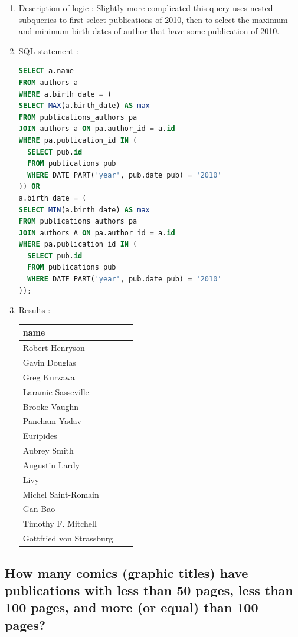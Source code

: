 \documentclass[doubleside, titlepage]{article}
\begin{document}
			\begin{enumerate}
	\item Description of logic : Slightly more complicated this query uses nested subqueries to first select publications of 2010, then to select the maximum and minimum  birth dates of author that have some publication of 2010.
	\item SQL statement :
		\begin{lstlisting}[language=SQL,showspaces=false,basicstyle=\ttfamily,numberstyle=\tiny,commentstyle=\color{gray}]
SELECT a.name
FROM authors a
WHERE a.birth_date = (
SELECT MAX(a.birth_date) AS max
FROM publications_authors pa
JOIN authors a ON pa.author_id = a.id
WHERE pa.publication_id IN (
  SELECT pub.id
  FROM publications pub
  WHERE DATE_PART('year', pub.date_pub) = '2010'
)) OR
a.birth_date = (
SELECT MIN(a.birth_date) AS max
FROM publications_authors pa
JOIN authors A ON pa.author_id = a.id
WHERE pa.publication_id IN (
  SELECT pub.id
  FROM publications pub
  WHERE DATE_PART('year', pub.date_pub) = '2010'
));
		\end{lstlisting}

	\item Results :\\

	\begin{tabular}{|l|c|r|}
  \hline
  name \\
  \hline
Robert Henryson\\
Gavin Douglas\\
Greg Kurzawa\\
Laramie Sasseville\\
Brooke Vaughn\\
Pancham Yadav\\
Euripides\\
Aubrey Smith\\
Augustin Lardy\\
Livy\\
Michel Saint-Romain\\
Gan Bao\\
Timothy F. Mitchell\\
Gottfried von Strassburg\\
  \hline
\end{tabular}

	\end{enumerate}

\subsection{How many comics (graphic titles) have publications with less than 50 pages, less than 100 pages, and more (or equal) than 100 pages?}
\end{document}
